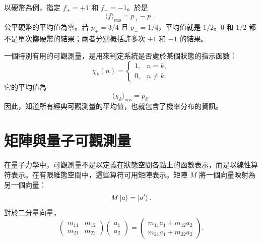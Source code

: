 以硬幣為例，指定 \(f_+=+1\) 和 \(f_-=-1\)。於是
\begin{equation}
  \langle f\rangle_{\mathrm{ens}}
  =p_+-p_-.
  \label{eq:l02-coin-expectation}
\end{equation}
公平硬幣的平均值為零。若 \(p_+=3/4\) 且 \(p_-=1/4\)，平均值就是 \(1/2\)。\(0\) 和 \(1/2\) 都不是單次擲硬幣的結果；兩者分別概括許多次 \(+1\) 和 \(-1\) 的結果。

\begin{classroomqa}
\end{classroomqa}

一個特別有用的可觀測量，是用來判定系統是否處於某個狀態的指示函數：
\begin{equation}
  \chi_k(n)=
  \begin{cases}
    1,&n=k,\\
    0,&n\ne k.
  \end{cases}
\end{equation}
它的平均值為
\begin{equation}
  \langle\chi_k\rangle_{\mathrm{ens}}=p_k.
\end{equation}
因此，知道所有經典可觀測量的平均值，也就包含了機率分布的資訊。

\section{矩陣與量子可觀測量}

在量子力學中，可觀測量不是以定義在狀態空間各點上的函數表示，而是以線性算符表示。在有限維態空間中，這些算符可用矩陣表示。矩陣 \(M\) 將一個向量映射為另一個向量：
\begin{equation}
  M\left\lvert a\right\rangle=\left\lvert a'\right\rangle.
  \label{eq:l02-matrix-action}
\end{equation}
對於二分量向量，
\begin{equation}
  \begin{pmatrix}
    m_{11}&m_{12}\\
    m_{21}&m_{22}
  \end{pmatrix}
  \begin{pmatrix}a_1\\a_2\end{pmatrix}
  =
  \begin{pmatrix}
    m_{11}a_1+m_{12}a_2\\
    m_{21}a_1+m_{22}a_2
  \end{pmatrix}.
  \label{eq:l02-matrix-components}
\end{equation}


